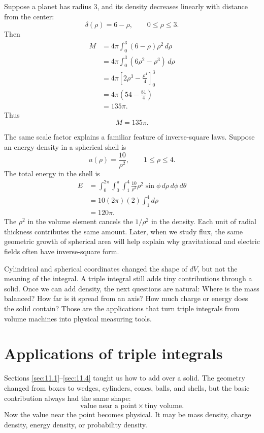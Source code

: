 \begin{example}
Suppose a planet has radius \(3\), and its density decreases linearly with distance from
the center:
\[
    \delta(\rho)=6-\rho,
    \qquad 0\le\rho\le3.
\]
Then
\[
\begin{aligned}
M
&=
4\pi\int_0^3(6-\rho)\rho^2\,d\rho\\
&=
4\pi\int_0^3(6\rho^2-\rho^3)\,d\rho\\
&=
4\pi\left[2\rho^3-\frac{\rho^4}{4}\right]_0^3\\
&=
4\pi\left(54-\frac{81}{4}\right)\\
&=
135\pi.
\end{aligned}
\]
Thus
\[
\boxed{
    M=135\pi.
}
\]
\end{example}

The same scale factor explains a familiar feature of inverse-square laws.  Suppose an
energy density in a spherical shell is
\[
    u(\rho)=\frac{10}{\rho^2},
    \qquad 1\le\rho\le4.
\]
The total energy in the shell is
\[
\begin{aligned}
E
&=
\int_0^{2\pi}\int_0^\pi\int_1^4
\frac{10}{\rho^2}\rho^2\sin\phi\,d\rho\,d\phi\,d\theta\\
&=
10(2\pi)(2)\int_1^4 d\rho\\
&=
120\pi.
\end{aligned}
\]
The \(\rho^2\) in the volume element cancels the \(1/\rho^2\) in the density.  Each
unit of radial thickness contributes the same amount.  Later, when we study flux, the
same geometric growth of spherical area will help explain why gravitational and electric
fields often have inverse-square form.

Cylindrical and spherical coordinates changed the shape of \(dV\), but not the meaning
of the integral.  A triple integral still adds tiny contributions through a solid.  Once we
can add density, the next questions are natural: Where is the mass balanced?  How far
is it spread from an axis?  How much charge or energy does the solid contain?  Those
are the applications that turn triple integrals from volume machines into physical
measuring tools.
\section{Applications of triple integrals}
\label{sec:11.5}

Sections \ref{sec:11.1}--\ref{sec:11.4} taught us how to add over a solid.  The
geometry changed from boxes to wedges, cylinders, cones, balls, and shells, but the
basic contribution always had the same shape:
\[
    \text{value near a point}\times \text{tiny volume}.
\]
Now the value near the point becomes physical.  It may be mass density, charge
density, energy density, or probability density.

